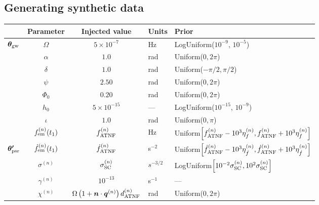 \documentclass[fleqn,usenatbib,useAMS]{mnras}
\begin{document}
\subsection{Generating synthetic data}\label{sec:synthetic_data}
\begin{table}
	\centering
		\begin{tabular}{lccll}
			\toprule
			&Parameter & Injected value & Units & Prior  \\
			\hline
			\multirow{7}{2mm}{$\boldsymbol{\theta}_{\rm gw}$} & $\Omega$       & $5 \times 10^{-7}$ & Hz & LogUniform($10^{-9}$, $10^{-5}$) \\
			& $\alpha$          & $1.0$  & rad & Uniform($0, 2 \pi $)\\
			& $\delta$              & $1.0$  & rad & Uniform($-\pi/2, \pi/2$) \\
			& $\psi$              & $2.50$ & rad & Uniform($0, 2 \pi $) \\
			& $\Phi_0$          & $0.20$ & rad & Uniform($0, 2 \pi $) \\
			& $h_0$            & $5 \times 10^{-15}$ & --- & LogUniform($10^{-15}$, $10^{-9}$) \\
			& $\iota$             & $1.0$ & rad & Uniform($0, \pi$) \\ 
			\hline
			\vspace{1mm}& $f_{\rm em}^{(n)} (t_1)$       & $f_{\rm ATNF}^{(n)}$ & Hz & Uniform$\left[f_{\rm ATNF}^{(n)} - 10^3 \eta^{(n)}_{f}, f_{\rm ATNF}^{(n)} + 10^3 \eta^{(n)}_{f} \right]$ \\
      \multirow{2}{2mm}{$\boldsymbol{\theta'}_{\rm psr}$} & $\dot{f}_{\rm em}^{(n)} (t_1)$       & $\dot{f}_{\rm ATNF}^{(n)}$ & s$^{-2}$ & Uniform$\left[ \dot{f}_{\rm ATNF}^{(n)} - 10^3 \eta^{(n)}_{\dot{f}}, \dot{f}_{\rm ATNF}^{(n)} + 10^3 \eta^{(n)}_{\dot{f}} \right]$ \\
		     & $\sigma^{(n)}$              & $\sigma_{\rm SC}^{(n)}$ & $s^{-3/2}$ & LogUniform$ \left [10^{-2} \sigma_{\rm SC}^{(n)}, 10^2 \sigma_{\rm SC}^{(n)} \right ]$ \\
			& $\gamma^{(n)}$              & $10^{-13}$ & s$^{-1}$ & --- \\
			\hline
			\vspace{1mm} &  $\chi^{(n)}$       &$\Omega \left( 1 + \boldsymbol{n}\cdot \boldsymbol{q}^{(n)} \right)  d_{\rm ATNF}^{(n)} $  & rad & Uniform($0, 2 \pi $) \\
			\bottomrule
		\end{tabular}

\end{table}
\end{document}
